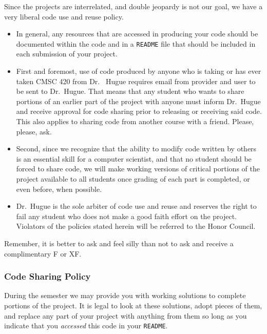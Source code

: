 \documentclass[12pt]{article}
\begin{document}
Since the projects are interrelated, and double jeopardy is not our
goal, we have a very liberal code use and reuse policy.

\begin{itemize}

\item In general, any resources that are accessed in producing your
  code should be documented within the code and in a \texttt{README}
  file that should be included in each submission of your project.

\item First and foremost, use of code produced by anyone who is taking
  or has ever taken CMSC 420 from Dr.~ Hugue requires email from
  provider and user to be sent to Dr.~Hugue.  That means that any
  student who wants to share portions of an earlier part of the
  project with anyone must inform Dr.~Hugue and receive approval for
  code sharing prior to releasing or receiving said code. This also
  applies to sharing code from another course with a friend. Please,
  please, ask. 


\item Second, since we recognize that the ability to modify code
  written by others is an essential skill for a computer scientist,
  and that no student should be forced to share code, we will make
  working versions of critical portions of the project available to
  all students once grading of each part is completed, or even before,
  when possible.

\item Dr.~Hugue is the sole arbiter of code use and reuse and reserves
  the right to fail any student who does not make a good faith effort
  on the project.  Violators of the policies stated herein will be
  referred to the Honor Council.

\end{itemize}

Remember, it is better to ask and feel silly than not to ask and
receive a complimentary F or XF.

\subsubsection{Code Sharing Policy}

During the semester we may provide you with working solutions to
complete portions of the project.  It is legal to look at these
solutions, adopt pieces of them, and replace any part of your project
with anything from them so long as you indicate that you
\emph{accessed} this code in your \texttt{README}.
\end{document}

